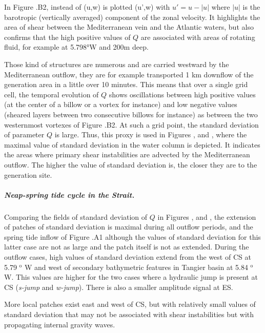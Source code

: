 In Figure .B2, instead of (u,w) is plotted (u',w) with $u'=u-|u|$ where $|u|$ is the barotropic (vertically averaged) component of the zonal velocity. It highlights the area of shear between the Mediterranean vein and the Atlantic waters, but also confirms that the high positive values of $Q$ are associated with areas of rotating fluid, for example at 5.798°W and 200m deep. 

Those kind of structures are numerous and are carried westward by the Mediterranean outflow, they are for example transported 1 km downflow of the generation area in a little over 10 minutes. This means that over a single grid cell, the temporal evolution of $Q$ shows oscillations between high positive values (at the center of a billow or a vortex for instance) and low negative values (sheared layers between two consecutive billows for instance) as between the two westernmost vortexes of Figure .B2. At such a grid point, the standard deviation of parameter $Q$ is large. Thus, this proxy is used in Figures ,  and , where the maximal value of standard deviation in the water column is depicted. It indicates the areas where primary shear instabilities are advected by the Mediterranean outflow. The higher the value of standard deviation is, the closer they are to the generation site.

\subparagraph{Neap-spring tide cycle in the Strait.}
Comparing the fields of standard deviation of $Q$ in Figures ,  and , the extension of patches of standard deviation is maximal during all outflow periods, and the spring tide inflow of Figure .A1 although the values of standard deviation for this latter case are not as large and the patch itself is not as extended. During the outflow cases, high values of standard deviation extend from the west of CS at 5.79 $^\text{o}$ W and west of secondary bathymetric features in Tangier basin at 5.84 $^\text{o}$ W. This values are higher for the two cases where a hydraulic jump is present at CS (\textit{s-jump} and \textit{w-jump}). There is also a smaller amplitude signal at ES.

More local patches exist east and west of CS, but with relatively small values of standard deviation that may not be associated with shear instabilities but with propagating internal gravity waves.

